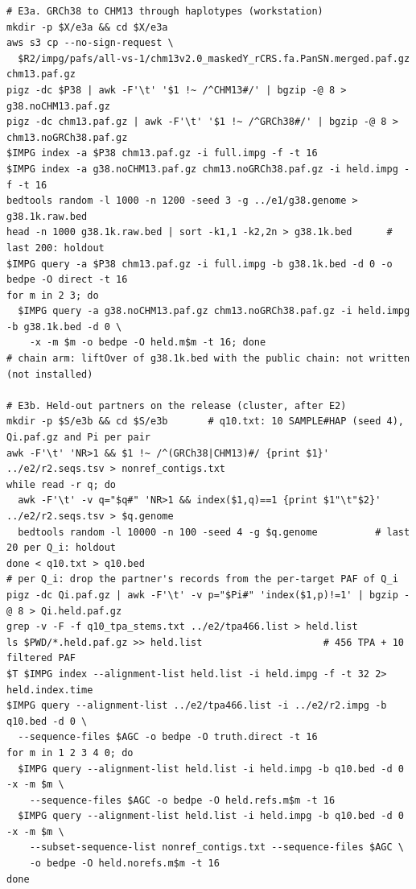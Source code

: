 {\begin{verbatim}
# E3a. GRCh38 to CHM13 through haplotypes (workstation)
mkdir -p $X/e3a && cd $X/e3a
aws s3 cp --no-sign-request \
  $R2/impg/pafs/all-vs-1/chm13v2.0_maskedY_rCRS.fa.PanSN.merged.paf.gz chm13.paf.gz
pigz -dc $P38 | awk -F'\t' '$1 !~ /^CHM13#/' | bgzip -@ 8 > g38.noCHM13.paf.gz
pigz -dc chm13.paf.gz | awk -F'\t' '$1 !~ /^GRCh38#/' | bgzip -@ 8 > chm13.noGRCh38.paf.gz
$IMPG index -a $P38 chm13.paf.gz -i full.impg -f -t 16
$IMPG index -a g38.noCHM13.paf.gz chm13.noGRCh38.paf.gz -i held.impg -f -t 16
bedtools random -l 1000 -n 1200 -seed 3 -g ../e1/g38.genome > g38.1k.raw.bed
head -n 1000 g38.1k.raw.bed | sort -k1,1 -k2,2n > g38.1k.bed      # last 200: holdout
$IMPG query -a $P38 chm13.paf.gz -i full.impg -b g38.1k.bed -d 0 -o bedpe -O direct -t 16
for m in 2 3; do
  $IMPG query -a g38.noCHM13.paf.gz chm13.noGRCh38.paf.gz -i held.impg -b g38.1k.bed -d 0 \
    -x -m $m -o bedpe -O held.m$m -t 16; done
# chain arm: liftOver of g38.1k.bed with the public chain: not written (not installed)

# E3b. Held-out partners on the release (cluster, after E2)
mkdir -p $S/e3b && cd $S/e3b       # q10.txt: 10 SAMPLE#HAP (seed 4), Qi.paf.gz and Pi per pair
awk -F'\t' 'NR>1 && $1 !~ /^(GRCh38|CHM13)#/ {print $1}' ../e2/r2.seqs.tsv > nonref_contigs.txt
while read -r q; do
  awk -F'\t' -v q="$q#" 'NR>1 && index($1,q)==1 {print $1"\t"$2}' ../e2/r2.seqs.tsv > $q.genome
  bedtools random -l 10000 -n 100 -seed 4 -g $q.genome          # last 20 per Q_i: holdout
done < q10.txt > q10.bed
# per Q_i: drop the partner's records from the per-target PAF of Q_i
pigz -dc Qi.paf.gz | awk -F'\t' -v p="$Pi#" 'index($1,p)!=1' | bgzip -@ 8 > Qi.held.paf.gz
grep -v -F -f q10_tpa_stems.txt ../e2/tpa466.list > held.list
ls $PWD/*.held.paf.gz >> held.list                     # 456 TPA + 10 filtered PAF
$T $IMPG index --alignment-list held.list -i held.impg -f -t 32 2> held.index.time
$IMPG query --alignment-list ../e2/tpa466.list -i ../e2/r2.impg -b q10.bed -d 0 \
  --sequence-files $AGC -o bedpe -O truth.direct -t 16
for m in 1 2 3 4 0; do
  $IMPG query --alignment-list held.list -i held.impg -b q10.bed -d 0 -x -m $m \
    --sequence-files $AGC -o bedpe -O held.refs.m$m -t 16
  $IMPG query --alignment-list held.list -i held.impg -b q10.bed -d 0 -x -m $m \
    --subset-sequence-list nonref_contigs.txt --sequence-files $AGC \
    -o bedpe -O held.norefs.m$m -t 16
done


\end{verbatim}}
